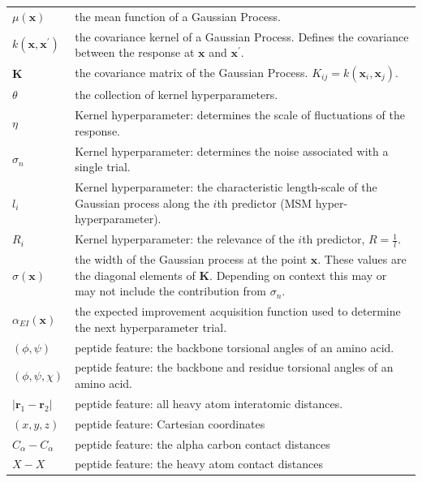 \begin{table}
\begin{tabularx}{0.9\textwidth}{ l >{\raggedright\arraybackslash}X  }
        $\mu(\mathbf{x})$ & the mean function of a Gaussian Process. \\
        $k(\mathbf{x}, \mathbf{x}^{\prime})$ & the covariance kernel of a Gaussian Process. Defines the covariance between the response at $\mathbf{x}$ and $\mathbf{x}^{\prime}$. \\
        $\mathbf{K}$ & the covariance matrix of the Gaussian Process. $K_{ij} =k(\mathbf{x}_{i}, \mathbf{x}_{j})$. \\
        $\theta$ & the collection of kernel hyperparameters. \\
        $\eta$ & Kernel hyperparameter: determines the scale of fluctuations of the response. \\
        $\sigma_{n}$ & Kernel hyperparameter: determines the noise associated with a single trial. \\
        $l_{i}$ & Kernel hyperparameter: the characteristic length-scale of the Gaussian process 
                along the $i$th predictor (MSM hyper-hyperparameter).\\
        $R_{i}$ & Kernel hyperparameter: the relevance of the $i$th predictor, $R=\frac{1}{l}$. \\ 
        $\sigma(\mathbf{x})$ & the width of the Gaussian process at the point $\mathbf{x}$. These values  are the diagonal elements of $\mathbf{K}$. Depending on context this may or may not include the contribution from $\sigma_{n}$. \\
        $\alpha_{EI}(\mathbf{x})$ & the expected improvement acquisition function used to determine the next hyperparameter trial. \\
        $(\phi, \psi)$ & peptide feature: the backbone torsional angles of an amino acid.  \\
        $(\phi, \psi, \chi)$ & peptide feature: the backbone and residue torsional angles of an amino acid. \\
        $|\mathbf{r}_{1}-\mathbf{r}_{2}|$ & peptide feature: all heavy atom interatomic distances.  \\
        $(x, y, z)$ & peptide feature: Cartesian coordinates \\
        $C_{\alpha}-C_{\alpha}$ & peptide feature: the alpha carbon contact distances \\
        $X-X$ & peptide feature: the heavy atom contact distances \\
     \hline
     \end{tabularx}
    \label{tab:msm_symbols}
\end{table}

